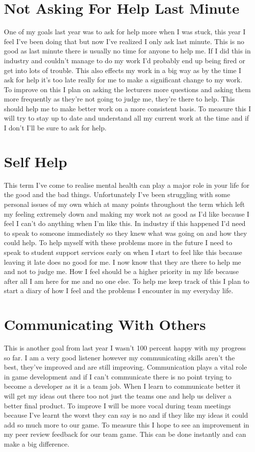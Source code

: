 \documentclass{scrartcl}
\begin{document}
\section{Not Asking For Help Last Minute}
One of my goals last year was to ask for help more when I was stuck, this year I feel I've been doing that but now I've realized I only ask last minute. This is no good as last minute there is usually no time for anyone to help me. If I did this in industry and couldn't manage to do my work I'd probably end up being fired or get into lots of trouble. This also effects my work in a big way as by the time I ask for help it's too late really for me to make a significant change to my work. To improve on this I plan on asking the lecturers more questions and asking them more frequently as they're not going to judge me, they're there to help. This should help me to make better work on a more consistent basis. To measure this I will try to stay up to date and understand all my current work at the time and if I don't I'll be sure to ask for help.


\section{Self Help}
This term I've come to realise mental health can play a major role in your life for the good and the bad things. Unfortunately I've been struggling with some personal issues of my own which at many points throughout the term which left my feeling extremely down and making my work not as good as I'd like because I feel I can't do anything when I'm like this. In industry if this happened I'd need to speak to someone immediately so they knew what was going on and how they could help. To help myself with these problems more in the future I need to speak to student support services early on when I start to feel like this because leaving it late does no good for me. I now know that they are there to help me and not to judge me. How I feel should be a higher priority in my life because after all I am here for me and no one else. To help me keep track of this I plan to start a diary of how I feel and the problems I encounter in my everyday life.


\section{Communicating With Others}
This is another goal from last year I wasn't 100 percent happy with my progress so far. I am a very good listener however my communicating skills aren't the best, they've improved and are still improving. Communication plays a vital role in game development and if I can't communicate there is no point trying to become a developer as it is a team job. When I learn to communicate better it will get my ideas out there too not just the teams one and help us deliver a better final product. To improve I will be more vocal during team meetings because I've learnt the worst they can say is no and if they like my ideas it could add so much more to our game. To measure this I hope to see an improvement in my peer review feedback for our team game. This can be done instantly and can make a big difference.
\end{document}
